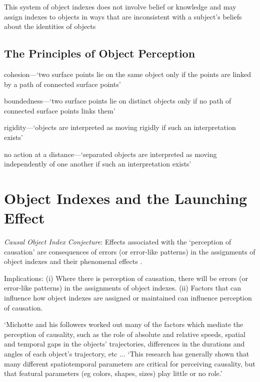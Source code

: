 \documentclass[12pt]{extarticle}
\begin{document}
\begin{multicols*}{3}
This system of object indexes
does not involve belief or knowledge
and may assign indexes to objects in ways that are inconsistent with
a subject’s beliefs about the identities of objects
\citep[e.g.][]{Mitroff:2004pc, mitroff:2007_space}


\subsection{The Principles of Object Perception}
 
cohesion—‘two surface points lie on the same object only if the points are linked by a path of 
connected surface points’
 
boundedness—‘two surface points lie on distinct objects only if no path of connected surface points 
links them’
 
rigidity—‘objects are interpreted as moving rigidly if such an interpretation exists’
 
no action at a distance—‘separated objects are interpreted as moving independently of one another if such an 
interpretation exists’ \citep{Spelke:1990jn}
 

\section{Object Indexes and the Launching Effect}

\emph{Causal Object Index Conjecture}:
Effects associated with the ‘perception of causation’
are consequences of errors (or error-like patterns) in the assignments of object indexes and
their phenomenal effects \citep[compare][]{Krushke:1996ge}.

Implications:
(i) Where there is perception of causation, there will be errors (or error-like patterns)
in the assignments of object indexes.
(ii) Factors that can influence how object indexes are assigned or maintained can influence
perception of causation.


‘Michotte and his followers worked out many of the factors which mediate
the perception of causality, such as the role of absolute and relative
speeds, spatial and temporal gaps in the objects' trajectories, differences
in the durations and angles of each object's trajectory, etc ...
‘This research has generally shown that many different  spatiotemporal parameters are critical for perceiving causality, but  that featural parameters (eg colors, shapes, sizes) play little or no role.’
\citep[p.~456]{Scholl:2004dx}


\end{multicols*}
\end{document}
